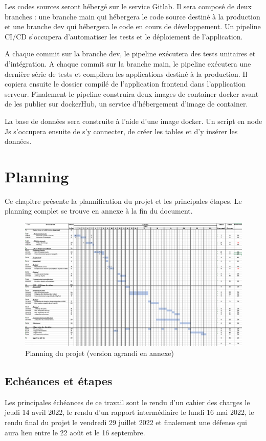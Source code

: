 \documentclass[
    iai, %
    il, %
]{heig-tb}
\begin{document}
Les codes sources seront hébergé sur le service Gitlab. Il sera composé de deux branches :
une branche main qui hébergera le code source destiné à la production et une branche dev qui hébergera le code en cours de développement.
Un pipeline CI/CD s'occupera d'automatiser les tests et le déploiement de l'application.

A chaque commit sur la branche dev, le pipeline exécutera des tests unitaires et d'intégration.
A chaque commit sur la branche main, le pipeline exécutera une dernière série de tests et
compilera les applications destiné à la production.
Il copiera ensuite le dossier compilé de l'application frontend dans l'application serveur.
Finalement le pipeline construira deux images de container docker avant de les publier sur dockerHub, un service d'hébergement d'image de container.

La base de données sera construite à l'aide d'une image docker.
Un script en node Js s'occupera ensuite de s'y connecter, de créer les tables et d'y insérer les données.

\chapter{Planning}
Ce chapitre présente la plannification du projet et les principales étapes.
Le planning complet se trouve en annexe à la fin du document.

\begin{figure}[H]
    \caption{Planning du projet (version agrandi en annexe)}
    \centering
    \includegraphics[scale=0.5]{planning.png}
\end{figure}

\section{Echéances et étapes}
Les principales échéances de ce travail sont le rendu d'un cahier des charges le jeudi 14 avril 2022,
le rendu d'un rapport intermédiaire le lundi 16 mai 2022,
le rendu final du projet le vendredi 29 juillet 2022 et
finalement une défense qui aura lieu entre le 22 août et le 16 septembre.
\end{document}
